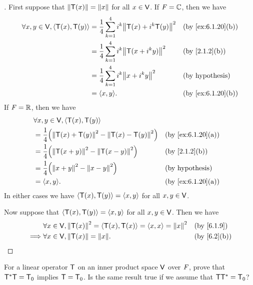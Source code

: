 \begin{proof}[]
	First suppose that \(\left\lVert\mathsf{T}(x)\right\rVert = \left\lVert x\right\rVert\) for all \(x \in \mathsf{V}\).
	If \(\mathit{F} = \mathbb{C}\), then we have
	\begin{align*}
		\forall x, y \in \V, \inn{\T(x), \T(y)} & = \frac{1}{4} \sum_{k = 1}^4 i^k \norm{\T(x) + i^k \T(y)}^2 &  & \by{ex:6.1.20}[b]      \\
		                                        & = \frac{1}{4} \sum_{k = 1}^4 i^k \norm{\T(x + i^k y)}^2     &  & \by{2.1.2}[b]          \\
		                                        & = \frac{1}{4} \sum_{k = 1}^4 i^k \norm{x + i^k y}^2         &  & \text{(by hypothesis)} \\
		                                        & = \inn{x, y}.                                               &  & \by{ex:6.1.20}[b]
	\end{align*}
	If \(\mathit{F} = \mathbb{R}\), then we have
	\begin{align*}
		 & \forall x, y \in \V, \inn{\T(x), \T(y)}                                                        \\
		 & = \frac{1}{4} \pa{\norm{\T(x) + \T(y)}^2 - \norm{\T(x) - \T(y)}^2} &  & \by{ex:6.1.20}[a]      \\
		 & = \frac{1}{4} \pa{\norm{\T(x + y)}^2 - \norm{\T(x - y)}^2}         &  & \by{2.1.2}[b]          \\
		 & = \frac{1}{4} \pa{\norm{x + y}^2 - \norm{x - y}^2}                 &  & \text{(by hypothesis)} \\
		 & = \inn{x, y}.                                                      &  & \by{ex:6.1.20}[a]
	\end{align*}
	In either cases we have \(\left\langle\mathsf{T}(x), \mathsf{T}(y)\right\rangle = \left\langle x, y\right\rangle\) for all \(x, y \in \mathsf{V}\).

	Now suppose that \(\left\langle\mathsf{T}(x), \mathsf{T}(y)\right\rangle = \left\langle x, y\right\rangle\) for all \(x, y \in \mathsf{V}\).
	Then we have
	\begin{align*}
		         & \forall x \in \V, \norm{\T(x)}^2 = \inn{\T(x), \T(x)} = \inn{x, x} = \norm{x}^2 &  & \by{6.1.9}  \\
		\implies & \forall x \in \V, \norm{\T(x)} = \norm{x}.                                      &  & \by{6.2}[b]
	\end{align*}
\end{proof}

\begin{ex}\label{ex:6.3.11}
	For a linear operator \(\mathsf{T}\) on an inner product space \(\mathsf{V}\) over \(\mathit{F}\), prove that \(\mathsf{T}^* \mathsf{T} = \mathsf{T}_0\) implies \(\mathsf{T} = \mathsf{T}_0\).
	Is the same result true if we assume that \(\mathsf{T} \mathsf{T}^* = \mathsf{T}_0\)?
\end{ex}

